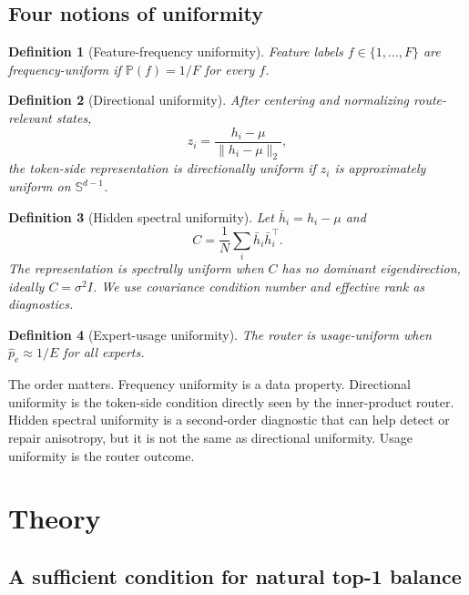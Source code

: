 \documentclass{article}
\newtheorem{definition}{Definition}
\begin{document}
\subsection{Four notions of uniformity}

\begin{definition}[Feature-frequency uniformity]
Feature labels $f\in\{1,\ldots,F\}$ are frequency-uniform if
$\mathbb{P}(f)=1/F$ for every $f$.
\end{definition}

\begin{definition}[Directional uniformity]
After centering and normalizing route-relevant states,
\begin{equation}
 z_i=\frac{h_i-\mu}{\|h_i-\mu\|_2},
\end{equation}
the token-side representation is directionally uniform if $z_i$ is approximately
uniform on $\mathbb{S}^{d-1}$.
\end{definition}

\begin{definition}[Hidden spectral uniformity]
Let $\bar h_i=h_i-\mu$ and
\begin{equation}
 C=\frac{1}{N}\sum_i \bar h_i\bar h_i^\top.
\end{equation}
The representation is spectrally uniform when $C$ has no dominant eigendirection,
ideally $C=\sigma^2 I$.  We use covariance condition number and effective rank
as diagnostics.
\end{definition}

\begin{definition}[Expert-usage uniformity]
The router is usage-uniform when $\widehat p_e\approx 1/E$ for all experts.
\end{definition}

The order matters.  Frequency uniformity is a data property.  Directional
uniformity is the token-side condition directly seen by the inner-product router.
Hidden spectral uniformity is a second-order diagnostic that can help detect or
repair anisotropy, but it is not the same as directional uniformity.  Usage
uniformity is the router outcome.

\section{Theory}

\subsection{A sufficient condition for natural top-1 balance}
\end{document}
